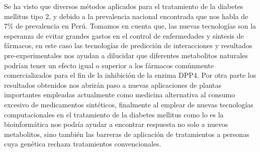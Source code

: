 Se ha visto que diversos métodos aplicados para el tratamiento de la diabetes mellitus tipo 2, y debido a la prevalencia nacional encontrada que nos habla de 7\% de prevalencia en Perú. Tomamos en cuenta que, las nuevas tecnologías son la esperanza de evitar grandes gastos en el control de enfermedades y síntesis de fármacos, en este caso las tecnologías de predicción de interacciones y resultados pre-experimentales nos ayudan a dilucidar que diferentes metabolitos naturales podrían tener un efecto igual o superior a los fármacos comúnmente comercializados para el fin de la inhibición de la enzima DPP4. 
Por otra parte los resultados obtenidos nos abrirán paso a nuevas aplicaciones de plantas importantes empleadas actualmente como medicina alternativa al consumo excesivo de medicamentos sintéticos, finalmente al emplear de nuevas tecnologías computacionales en el tratamiento de la diabetes mellitus como lo es la bioinformática nos podría ayudar a encontrar respuesta no solo a nuevos metabolitos, sino también las barreras de aplicación de tratamientos a personas cuya genética rechaza tratamientos convencionales.%



